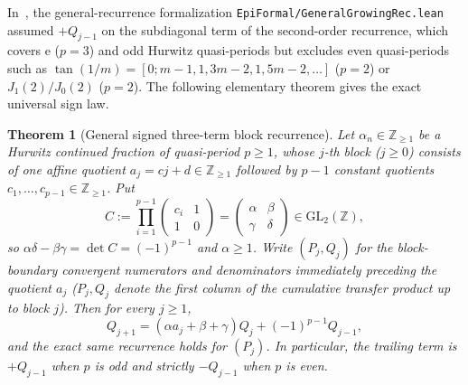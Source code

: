 \documentclass[11pt]{article}
\newtheorem{theorem}{Theorem}[section]
\theoremstyle{definition}
\theoremstyle{remark}
\newcommand{\Z}{\mathbb{Z}}
\newcommand{\ee}{\mathrm{e}}
\begin{document}
In~\cite{Paper2}, the general-recurrence formalization \texttt{EpiFormal/\allowbreak GeneralGrowingRec.lean}
assumed $+Q_{j-1}$ on the subdiagonal term of the second-order recurrence, which
covers $\ee$ ($p=3$) and odd Hurwitz quasi-periods but excludes even quasi-periods
such as $\tan(1/m)=[0;m-1,1,3m-2,1,5m-2,\dots]$ ($p=2$) or $J_1(2)/J_0(2)$ ($p=2$).
The following elementary theorem gives the exact universal sign law.

\begin{theorem}[General signed three-term block recurrence]\label{thm:even-hurwitz}
Let $\alpha_n\in\Z_{\ge1}$ be a Hurwitz continued fraction of quasi-period $p\ge1$,
whose $j$-th block ($j\ge0$) consists of one affine quotient $a_j=cj+d\in\Z_{\ge1}$
followed by $p-1$ constant quotients $c_1,\dots,c_{p-1}\in\Z_{\ge1}$. Put
\[
C:=\prod_{i=1}^{p-1}\begin{pmatrix}c_i&1\\1&0\end{pmatrix}
=\begin{pmatrix}\alpha&\beta\\\gamma&\delta\end{pmatrix}\in\mathrm{GL}_2(\Z),
\]
so $\alpha\delta-\beta\gamma=\det C=(-1)^{p-1}$ and $\alpha\ge 1$. Write $(P_j,Q_j)$
for the block-boundary convergent numerators and denominators immediately preceding
the quotient $a_j$ ($P_j,Q_j$ denote the first column of the cumulative transfer
product up to block $j$). Then for every $j\ge 1$,
\begin{equation}\label{eq:signed-hurwitz-rec}
Q_{j+1}=(\alpha a_j+\beta+\gamma)Q_j+(-1)^{p-1}Q_{j-1},
\end{equation}
and the exact same recurrence holds for $(P_j)$. In particular, the trailing term
is $+Q_{j-1}$ when $p$ is odd and strictly $-Q_{j-1}$ when $p$ is even.
\end{theorem}
\end{document}

